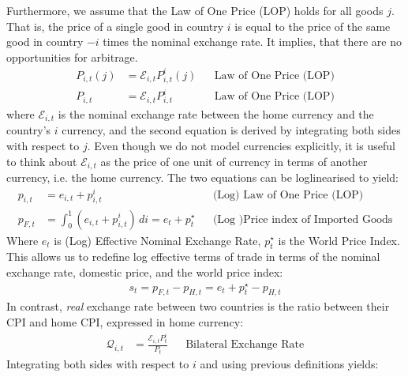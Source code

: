 Furthermore, we assume that the Law of One Price (LOP) holds for all goods $j$. That is, the price of a single good in country $i$ is equal to the price of the same good in country $-i$ times the nominal exchange rate. It implies, that there are no opportunities for arbitrage.
\begin{align}
    P_{i,t}(j) & = \mathcal{E}_{i,t}P_{i,t}^i(j)                                                                         &  & \text{Law of One Price (LOP)}              \\
    P_{i,t}    & = \mathcal{E}_{i,t}P_{i,t}^i                                                                            &  & \text{Law of One Price (LOP)}              
\end{align}
where $\mathcal{E}_{i,t}$ is the nominal exchange rate between the home currency and the country's $i$ currency, and the second equation is derived by integrating both sides with respect to $j$. Even though we do not model currencies explicitly, it is useful to think about $\mathcal{E}_{i,t}$ as the price of one unit of currency in terms of another currency, i.e. the home currency. The two equations can be loglinearised to yield:
\begin{align}
    p_{i,t}    & = e_{i,t}+p_{i,t}^i                                                                                     &  & \text{(Log) Law of One Price (LOP)}        \\
    p_{F,t}    & = \int_{0}^{1}(e_{i,t}+p_{i,t}^i) \,di = e_t + p_t^{\star} \label{eq:log_price_index_of_imported_goods} &  & \text{(Log )Price index of Imported Goods}
\end{align}
Where $e_t$ is (Log) Effective Nominal Exchange Rate, $p_t^{\star}$ is the World Price Index. This allows us to redefine log effective terms of trade in terms of the nominal exchange rate, domestic price, and the world price index:
\begin{align}
    s_t = p_{F,t} - p_{H,t} = e_t + p_t^{\star} - p_{H,t} \label{eq:terms_of_trade_with_world_price_index}
\end{align}
In contrast, \textit{real} exchange rate between two countries is the ratio between their CPI and home CPI, expressed in home currency:
\begin{align}
    \mathcal{Q}_{i,t} & = \frac{\mathcal{E}_{i,t}P_{t}^i}{P_t}                                        &  & \text{Bilateral Exchange Rate}                                       
\end{align}
Integrating both sides with respect to $i$ and using previous definitions yields:
